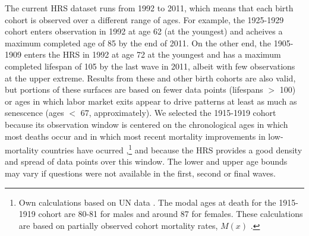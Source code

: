 \documentclass[11pt,oneside,a4paper]{article}
\begin{document}
The current HRS dataset runs from 1992 to 2011, which
means that each birth cohort is observed over a different range of ages. For
example, the 1925-1929 cohort enters observation in 1992 at age 62 (at the
youngest) and acheives a maximum completed age of 85 by the end of 2011. On the
other end, the 1905-1909 enters the HRS in 1992 at age 72 at the youngest and
has a maximum completed lifespan of 105 by the last wave in 2011, albeit with
few observations at the upper extreme. Results from these and other birth cohorts are also
valid, but portions of these surfaces are based on fewer data points (lifespans $>$ 100) or ages in which labor market
exits appear to drive patterns at least as much as senescence (ages $<$ 67,
approximately). We selected the 1915-1919 cohort because
its observation window is centered on the chronological ages in which most
deaths occur and in which most recent mortality improvements in
low-mortality countries have ocurred ,\footnote{Own calculations based on UN
data \citep{UN2012prospects}. The modal ages at death for the 1915-1919 cohort
are 80-81 for males and around 87 for females. These calculations are based on
partially observed cohort mortality rates, $M(x)$ \citep{HMD}.} and because the
HRS provides a good density and spread of data points over this window. The lower and upper age bounds may vary if questions were not available in the first, second or final waves.


\end{document}
